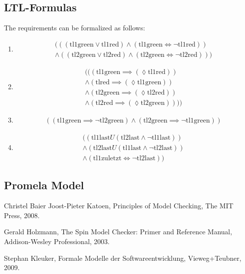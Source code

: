 \documentclass[a4paper, twoside]{article}
\begin{document}
\subsection{LTL-Formulas}
\label{sec:exampleltl}

The requirements can be formalized as follows:

\begin{enumerate}
\item 
  \begin{multline}
    (((\text{tl1green} \lor \text{tl1red}) \land (\text{tl1green}\iff \neg \text{tl1red})) \\ \land((\text{tl2green} \lor \text{tl2red})\land (\text{tl2green} \iff \neg \text{tl2red})))
  \end{multline}
\item
  \begin{multline}
    \label{eq:ltlreq1}
    (((\text{tl1green} \implies (\lozenge \text{tl1red})) \\
    \land (\text{tlred} \implies (\lozenge \text{tl1green}))\\
    \land (\text{tl2green} \implies (\lozenge \text{tl2red})) \\
    \land (\text{tl2red} \implies (\lozenge \text{tl2green}))))
  \end{multline}
\item
  \begin{multline}
    \label{eq:ltlreq2}
    ((\text{tl1green} \implies \neg \text{tl2green}) \land (\text{tl2green} \implies \neg \text{tl1green}))
  \end{multline}
\item
  \begin{multline}
    \label{eq:ltlreq3}
    ((\text{tl1last} U(\text{tl2last} \land \neg \text{tl1last})) \\
    \land (\text{tl2last} U (\text{tl1last} \land \neg \text{tl2last}))\\
\land(\text{tl1zuletzt} \iff \neg \text{tl2last}))
  \end{multline}
\end{enumerate}

\subsection{Promela Model}
\label{sec:trafficlightsmodel}



\appendix

\begin{thebibliography}{9}
Christel Baier Joost-Pieter Katoen,
Principles of Model Checking,
The MIT Press,
2008.

Gerald Holzmann,
The Spin Model Checker: Primer and Reference Manual,
Addison-Wesley Professional,
2003.

Stephan Kleuker,
Formale Modelle der Softwareentwicklung,
Vieweg+Teubner,
2009.

\end{thebibliography}
\end{document}
